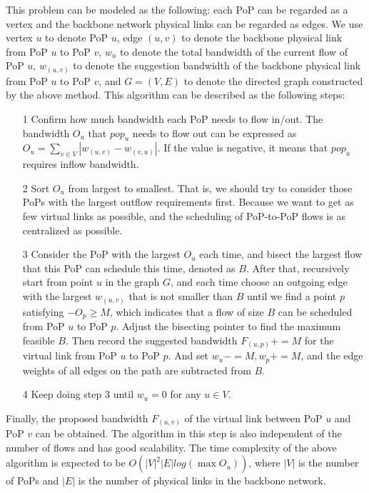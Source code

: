 {This problem can be modeled as the following: each PoP can be regarded as a vertex and the backbone network physical links can be regarded as edges. We use vertex $u$ to denote PoP $u$, edge $(u,v)$ to denote the backbone physical link from PoP $u$ to PoP $v$, $w_u$ to denote the total bandwidth of the current flow of PoP $u$, $w_{(u,v)}$ to denote the suggestion bandwidth of the backbone physical link from PoP $u$ to PoP $v$, and $G=(V, E)$ to denote the directed graph constructed by the above method. This algorithm can be described as the following steps:}

\begin{itemize}[leftmargin=*] 
\item[1] Confirm how much bandwidth each PoP needs to flow in/out. The bandwidth $O_u$ that $pop_u$ needs to flow out can be expressed as $O_u=\sum_{v\in V} |w_{(u,v)}-w_{(v,u)}| $. If the value is negative, it means that $pop_u$ requires inflow bandwidth.
\item[2] Sort $O_u$ from largest to smallest. That is, we should try to consider those PoPs with the largest outflow requirements first. Because we want to get as few virtual links as possible, and the scheduling of PoP-to-PoP flows is as centralized as possible.
\item[3] Consider the PoP with the largest $O_u$ each time, and bisect the largest flow that this PoP can schedule this time, denoted as $B$. After that, recursively start from point $u$ in the graph $G$, and each time choose an outgoing edge with the largest $w_{(u,v)}$ that is not smaller than $B$ until we find a point $p$ satisfying $-O_p\ge M$, which indicates that a flow of size $B$ can be scheduled from PoP $u$ to PoP $p$. Adjust the bisecting pointer to find the maximum feasible $B$. Then record the suggested bandwidth $F_{(u,p)}+=M$ for the virtual link from PoP $u$ to PoP $p$. And set $w_u-=M,w_p+=M$, and the edge weights of all edges on the path are subtracted from $B$.
\item[4] Keep doing step 3 until $w_u=0$ for any $u\in V$.
\end{itemize}

{Finally, the proposed bandwidth $F_{(u,v)}$ of the virtual link between PoP $u$ and PoP $v$ can be obtained. The algorithm in this step is also independent of the number of flows and has good scalability. The time complexity of the above algorithm is expected to be $O(|V|^2 |E| log(\max O_u))$, where $|V|$ is the number of PoPs and $|E|$ is the number of physical links in the backbone network.}

